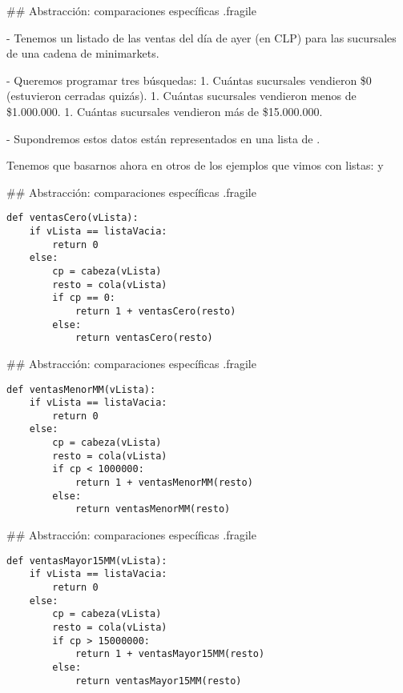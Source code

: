 ## Abstracción: comparaciones específicas {.fragile}


- Tenemos un listado de las ventas del día de ayer (en CLP)
para las sucursales de una cadena de minimarkets.

- Queremos programar tres búsquedas:
    1. Cuántas sucursales vendieron \$0 (estuvieron cerradas quizás).
    1. Cuántas sucursales vendieron menos de \$1.000.000.
    1. Cuántas sucursales vendieron más de \$15.000.000.

- Supondremos estos datos están representados en una lista de .

\bgnblockidea
Tenemos que basarnos ahora en otros de los ejemplos que vimos con listas:
 y 
\trmblockidea

## Abstracción: comparaciones específicas {.fragile}


\begin{lstlisting}[style=frame02]
def ventasCero(vLista):
    if vLista == listaVacia:
        return 0
    else:
        cp = cabeza(vLista)
        resto = cola(vLista)
        if cp == 0:
            return 1 + ventasCero(resto)
        else:
            return ventasCero(resto)
\end{lstlisting}

## Abstracción: comparaciones específicas {.fragile}


\begin{lstlisting}[style=frame02]
def ventasMenorMM(vLista):
    if vLista == listaVacia:
        return 0
    else:
        cp = cabeza(vLista)
        resto = cola(vLista)
        if cp < 1000000:
            return 1 + ventasMenorMM(resto)
        else:
            return ventasMenorMM(resto)
\end{lstlisting}

## Abstracción: comparaciones específicas {.fragile}


\begin{lstlisting}[style=frame02]
def ventasMayor15MM(vLista):
    if vLista == listaVacia:
        return 0
    else:
        cp = cabeza(vLista)
        resto = cola(vLista)
        if cp > 15000000:
            return 1 + ventasMayor15MM(resto)
        else:
            return ventasMayor15MM(resto)
\end{lstlisting}


